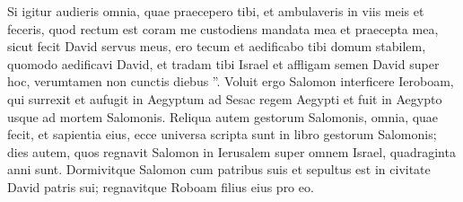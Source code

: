 \begin{biblechapter}
\begin{biblechapter}
\begin{biblechapter}
\begin{biblechapter}
\begin{biblechapter}
\begin{biblechapter}
\begin{biblechapter}
\begin{biblechapter}
\begin{biblechapter}
\begin{biblechapter}
\begin{biblechapter}
\verse Si igitur audieris omnia, quae praecepero tibi, et ambulaveris in viis meis et feceris, quod rectum est coram me custodiens mandata mea et praecepta mea, sicut fecit David servus meus, ero tecum et aedificabo tibi domum stabilem, quomodo aedificavi David, et tradam tibi Israel 
\verse et affligam semen David super hoc, verumtamen non cunctis diebus ”.
 \verse Voluit ergo Salomon interficere Ieroboam, qui surrexit et aufugit in Aegyptum ad Sesac regem Aegypti et fuit in Aegypto usque ad mortem Salomonis.
 \verse Reliqua autem gestorum Salomonis, omnia, quae fecit, et sapientia eius, ecce universa scripta sunt in libro gestorum Salomonis; 
\verse dies autem, quos regnavit Salomon in Ierusalem super omnem Israel, quadraginta anni sunt. 
\verse Dormivitque Salomon cum patribus suis et sepultus est in civitate David patris sui; regnavitque Roboam filius eius pro eo.
 

\end{biblechapter}
\end{biblechapter}
\end{biblechapter}
\end{biblechapter}
\end{biblechapter}
\end{biblechapter}
\end{biblechapter}
\end{biblechapter}
\end{biblechapter}
\end{biblechapter}
\end{biblechapter}
